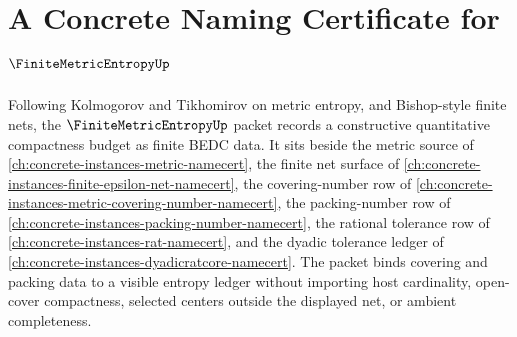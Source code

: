 \chapter{A Concrete Naming Certificate for $\FiniteMetricEntropyUp$}
\label{ch:concrete-instances-finite-metric-entropy-namecert}

Following Kolmogorov and Tikhomirov on metric entropy, and Bishop-style finite nets, the $\FiniteMetricEntropyUp$ packet records a constructive quantitative compactness budget as finite BEDC data. It sits beside the metric source of \autoref{ch:concrete-instances-metric-namecert}, the finite net surface of \autoref{ch:concrete-instances-finite-epsilon-net-namecert}, the covering-number row of \autoref{ch:concrete-instances-metric-covering-number-namecert}, the packing-number row of \autoref{ch:concrete-instances-packing-number-namecert}, the rational tolerance row of \autoref{ch:concrete-instances-rat-namecert}, and the dyadic tolerance ledger of \autoref{ch:concrete-instances-dyadicratcore-namecert}. The packet binds covering and packing data to a visible entropy ledger without importing host cardinality, open-cover compactness, selected centers outside the displayed net, or ambient completeness.

